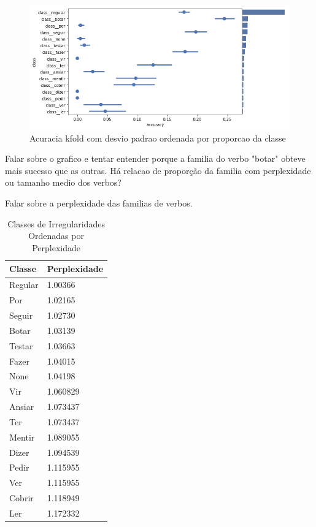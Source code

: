 \begin{figure}[H]
  \centering
  \includegraphics[width=1.0\linewidth]{img/accuracy_kfold_1.png}
  \caption{Acuracia kfold com desvio padrao ordenada por proporcao da classe}
  \label{fig:kfoldprop}
\end{figure}

Falar sobre o grafico e tentar entender porque a familia do verbo "botar" obteve mais sucesso que as outras. Há relacao de proporção da familia com perplexidade ou tamanho medio dos verbos?

Falar sobre a perplexidade das familias de verbos.

\begin{table}[]
\centering
\begin{tabular}{ll}
Classe  & Perplexidade \\
\toprule
Regular & 1.00366      \\
\hline
Por     & 1.02165      \\
\hline
Seguir  & 1.02730      \\
\hline
Botar   & 1.03139      \\
\hline
Testar  & 1.03663      \\
\hline
Fazer   & 1.04015      \\
\hline
None    & 1.04198      \\
\hline
Vir     & 1.060829     \\
\hline
Ansiar  & 1.073437     \\
\hline
Ter     & 1.073437     \\
\hline
Mentir  & 1.089055     \\
\hline
Dizer   & 1.094539     \\
\hline
Pedir   & 1.115955     \\
\hline
Ver     & 1.115955     \\
\hline
Cobrir  & 1.118949     \\
\hline
Ler     & 1.172332    \\
\bottomrule
\end{tabular}
\caption{Classes de Irregularidades Ordenadas por Perplexidade}
\label{tab:perplexity}
\end{table}


